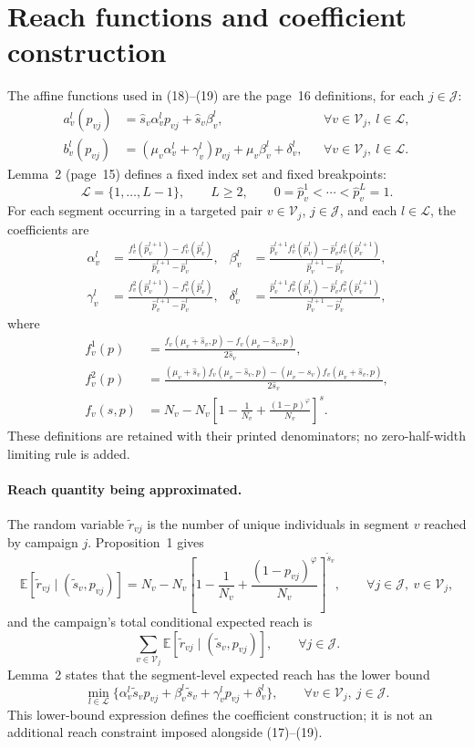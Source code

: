 \documentclass{article}
\begin{document}
\section*{Reach functions and coefficient construction}
The affine functions used in (18)--(19) are the page~16 definitions, for each $j\in\mathcal J$:
\begin{align*}
a^l_v(p_{vj})&=\hat s_v\alpha^l_vp_{vj}+\hat s_v\beta^l_v,
&&\forall v\in\mathcal V_j,\ l\in\mathcal L,\\
b^l_v(p_{vj})&=(\mu_v\alpha^l_v+\gamma^l_v)p_{vj}+\mu_v\beta^l_v+\delta^l_v,
&&\forall v\in\mathcal V_j,\ l\in\mathcal L.
\end{align*}
Lemma~2 (page~15) defines a fixed index set and fixed breakpoints:
\[
\mathcal L=\{1,\ldots,L-1\},\qquad L\geq2,\qquad
0=\hat p^1_v<\cdots<\hat p^L_v=1.
\]
For each segment occurring in a targeted pair $v\in\mathcal V_j$, $j\in\mathcal J$, and each $l\in\mathcal L$, the coefficients are
\begin{align*}
\alpha^l_v&=\frac{f^1_v(\hat p^{l+1}_v)-f^1_v(\hat p^l_v)}{\hat p^{l+1}_v-\hat p^l_v},&
\beta^l_v&=\frac{\hat p^{l+1}_vf^1_v(\hat p^l_v)-\hat p^l_vf^1_v(\hat p^{l+1}_v)}{\hat p^{l+1}_v-\hat p^l_v},\\
\gamma^l_v&=\frac{f^2_v(\hat p^{l+1}_v)-f^2_v(\hat p^l_v)}{\hat p^{l+1}_v-\hat p^l_v},&
\delta^l_v&=\frac{\hat p^{l+1}_vf^2_v(\hat p^l_v)-\hat p^l_vf^2_v(\hat p^{l+1}_v)}{\hat p^{l+1}_v-\hat p^l_v},
\end{align*}
where
\begin{align*}
f^1_v(p)&=\frac{f_v(\mu_v+\hat s_v,p)-f_v(\mu_v-\hat s_v,p)}{2\hat s_v},\\
f^2_v(p)&=\frac{(\mu_v+\hat s_v)f_v(\mu_v-\hat s_v,p)-(\mu_v-\hat s_v)f_v(\mu_v+\hat s_v,p)}{2\hat s_v},\\
f_v(s,p)&=N_v-N_v\left[1-\frac1{N_v}+\frac{(1-p)^\varphi}{N_v}\right]^s.
\end{align*}
These definitions are retained with their printed denominators; no zero-half-width limiting rule is added.

\paragraph{Reach quantity being approximated.}
The random variable $\tilde r_{vj}$ is the number of unique individuals in segment $v$ reached by campaign $j$. Proposition~1 gives
\[
\mathbb E[\tilde r_{vj}\mid(\tilde s_v,p_{vj})]
=N_v-N_v\left[1-\frac1{N_v}+\frac{(1-p_{vj})^\varphi}{N_v}\right]^{\tilde s_v},
\qquad\forall j\in\mathcal J,\ v\in\mathcal V_j,
\]
and the campaign's total conditional expected reach is
\[
\sum_{v\in\mathcal V_j}\mathbb E[\tilde r_{vj}\mid(\tilde s_v,p_{vj})],\qquad\forall j\in\mathcal J.
\]
Lemma~2 states that the segment-level expected reach has the lower bound
\[
\min_{l\in\mathcal L}\{\alpha^l_v\tilde s_vp_{vj}+\beta^l_v\tilde s_v+\gamma^l_vp_{vj}+\delta^l_v\},
\qquad\forall v\in\mathcal V_j,\ j\in\mathcal J.
\]
This lower-bound expression defines the coefficient construction; it is not an additional reach constraint imposed alongside (17)--(19).
\end{document}
